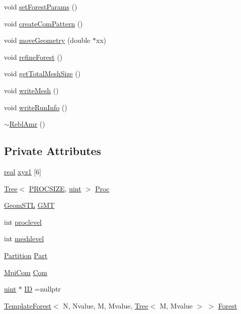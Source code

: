 \begin{DoxyCompactItemize}
\item 
void \mbox{\hyperlink{classReblAmr_ad6f63b60c46c82769a9d865f44a329dd}{set\+Forest\+Params}} ()
\item 
void \mbox{\hyperlink{classReblAmr_a664f6f7959bec8b2f38b9ee0a1747298}{create\+Com\+Pattern}} ()
\item 
void \mbox{\hyperlink{classReblAmr_ab35c58d7ff40251f6021688172eda329}{move\+Geometry}} (double $\ast$xx)
\item 
void \mbox{\hyperlink{classReblAmr_aaa3c7e59843ba6603e848c2406385fc9}{refine\+Forest}} ()
\item 
void \mbox{\hyperlink{classReblAmr_acd82ccef4a03c7c8c75e1cd4923d9eaa}{get\+Total\+Mesh\+Size}} ()
\item 
void \mbox{\hyperlink{classReblAmr_ae457adbea6445bc3a407b3e4ee1aa06b}{write\+Mesh}} ()
\item 
void \mbox{\hyperlink{classReblAmr_a1a5f144fa6c749227315f0098bc9ac7f}{write\+Run\+Info}} ()
\item 
\mbox{\hyperlink{classReblAmr_af52059b5251847e324784367498930a7}{$\sim$\+Rebl\+Amr}} ()
\end{DoxyCompactItemize}
\subsection*{Private Attributes}
\begin{DoxyCompactItemize}
\item 
\mbox{\hyperlink{definitions_8h_aedc0ad84d1e764530814f57ad931d02a}{real}} \mbox{\hyperlink{classReblAmr_abadf47bfc4c8453e3f9633df36e81ada}{xyz1}} \mbox{[}6\mbox{]}
\item 
\mbox{\hyperlink{classTree}{Tree}}$<$ \mbox{\hyperlink{params_8h_a869e77c8856c40dc7369197ee4ee8059ab3d1097d7132ac8b8c33439eb2e7c02f}{P\+R\+O\+C\+S\+I\+ZE}}, \mbox{\hyperlink{definitions_8h_a69aa29b598b851b0640aa225a9e5d61d}{uint}} $>$ \mbox{\hyperlink{classReblAmr_af59560765779ccba3b9722e2edfb0ae5}{Proc}}
\item 
\mbox{\hyperlink{classGeomSTL}{Geom\+S\+TL}} \mbox{\hyperlink{classReblAmr_a578fdac81e33fdc2098a77aa284a419c}{G\+MT}}
\item 
int \mbox{\hyperlink{classReblAmr_a5297343e897b4590989cec2d14895586}{proclevel}}
\item 
int \mbox{\hyperlink{classReblAmr_ac79b3649d10d28063e96be4144c4560a}{meshlevel}}
\item 
\mbox{\hyperlink{classPartition}{Partition}} \mbox{\hyperlink{classReblAmr_a26e32330b066f45fe5e12f65d92e3fc3}{Part}}
\item 
\mbox{\hyperlink{structMpiCom}{Mpi\+Com}} \mbox{\hyperlink{classReblAmr_adf0b8e77455c3078cd6fb3049d9cbf95}{Com}}
\item 
\mbox{\hyperlink{definitions_8h_a69aa29b598b851b0640aa225a9e5d61d}{uint}} $\ast$ \mbox{\hyperlink{classReblAmr_a89c3a7a5caa752d480fddeab19696eb3}{ID}} =nullptr
\item 
\mbox{\hyperlink{classTemplateForest}{Template\+Forest}}$<$ N, Nvalue, M, Mvalue, \mbox{\hyperlink{classTree}{Tree}}$<$ M, Mvalue $>$ $>$ \mbox{\hyperlink{classReblAmr_a7f5abdc0afc3fcd2c62ae7e52f61a2fa}{Forest}}
\end{DoxyCompactItemize}


